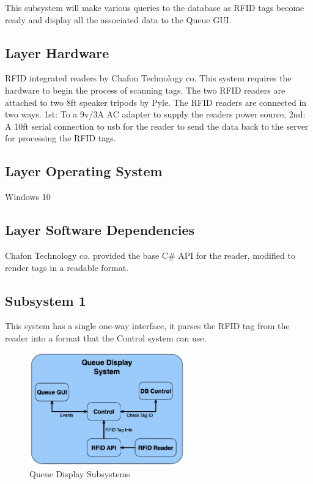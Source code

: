 	This subsystem will make various queries to the database as RFID tags become ready and display
all the associated data to the Queue GUI.

\subsection{Layer Hardware}
RFID integrated readers by Chafon Technology co. This system requires the hardware to begin the process of scanning tags. The two RFID readers are attached to two 8ft speaker tripods by Pyle. The RFID readers are connected in two ways. 1st: To a 9v/3A AC adapter to supply the readers power source,  2nd: A 10ft serial connection to usb for the reader to send the data back to the server for processing the RFID tags. 

\subsection{Layer Operating System}
Windows 10 

\subsection{Layer Software Dependencies}
Chafon Technology co. provided the base C# API for the reader, modified to render tags in a readable format. 

\subsection{Subsystem 1}
This system has a single one-way interface, it parses the RFID tag from the reader into a format
that the Control system can use.

\begin{figure}[h!]
	\centering
 	\includegraphics[width=0.60\textwidth]{images/ads_4}
 \caption{Queue Display Subsystems}
\end{figure}

